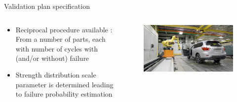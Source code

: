 \documentclass{renault-template}
\begin{document}
\begin{frame}{Validation plan specification}
  \begin{center}
  \end{center}

  \begin{columns}[t]
    \fontsize{8}{8}\selectfont

    \begin{column}{0.6\textwidth}
      \begin{itemize}
      \item Reciprocal procedure available : \\
        From a number of parts, each with number of cycles with (and/or without) failure
      \item Strength distribution scale parameter is determined leading to failure probability estimation
      \end{itemize}
    \end{column}
    \begin{column}{0.4\textwidth}
      \begin{figure}
        \includegraphics[width=\textwidth]{Illustration_StaRe/door-slamming-robot-blog-image.jpg}
      \end{figure}
    \end{column}
  \end{columns}
\end{frame}
\end{document}
